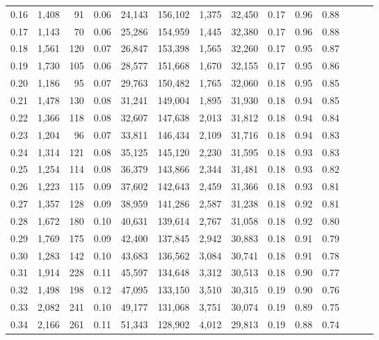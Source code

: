 \begin{tabular}{rrrrrrrrrrrrrr}
0.16 &  1,408 &     91 &  0.06 &   24,143 &  156,102 &   1,375 &  32,450 &  0.17 &  0.96 &      0.88 \\
0.17 &  1,143 &     70 &  0.06 &   25,286 &  154,959 &   1,445 &  32,380 &  0.17 &  0.96 &      0.88 \\
0.18 &  1,561 &    120 &  0.07 &   26,847 &  153,398 &   1,565 &  32,260 &  0.17 &  0.95 &      0.87 \\
0.19 &  1,730 &    105 &  0.06 &   28,577 &  151,668 &   1,670 &  32,155 &  0.17 &  0.95 &      0.86 \\
0.20 &  1,186 &     95 &  0.07 &   29,763 &  150,482 &   1,765 &  32,060 &  0.18 &  0.95 &      0.85 \\
0.21 &  1,478 &    130 &  0.08 &   31,241 &  149,004 &   1,895 &  31,930 &  0.18 &  0.94 &      0.85 \\
0.22 &  1,366 &    118 &  0.08 &   32,607 &  147,638 &   2,013 &  31,812 &  0.18 &  0.94 &      0.84 \\
0.23 &  1,204 &     96 &  0.07 &   33,811 &  146,434 &   2,109 &  31,716 &  0.18 &  0.94 &      0.83 \\
0.24 &  1,314 &    121 &  0.08 &   35,125 &  145,120 &   2,230 &  31,595 &  0.18 &  0.93 &      0.83 \\
0.25 &  1,254 &    114 &  0.08 &   36,379 &  143,866 &   2,344 &  31,481 &  0.18 &  0.93 &      0.82 \\
0.26 &  1,223 &    115 &  0.09 &   37,602 &  142,643 &   2,459 &  31,366 &  0.18 &  0.93 &      0.81 \\
0.27 &  1,357 &    128 &  0.09 &   38,959 &  141,286 &   2,587 &  31,238 &  0.18 &  0.92 &      0.81 \\
0.28 &  1,672 &    180 &  0.10 &   40,631 &  139,614 &   2,767 &  31,058 &  0.18 &  0.92 &      0.80 \\
0.29 &  1,769 &    175 &  0.09 &   42,400 &  137,845 &   2,942 &  30,883 &  0.18 &  0.91 &      0.79 \\
0.30 &  1,283 &    142 &  0.10 &   43,683 &  136,562 &   3,084 &  30,741 &  0.18 &  0.91 &      0.78 \\
0.31 &  1,914 &    228 &  0.11 &   45,597 &  134,648 &   3,312 &  30,513 &  0.18 &  0.90 &      0.77 \\
0.32 &  1,498 &    198 &  0.12 &   47,095 &  133,150 &   3,510 &  30,315 &  0.19 &  0.90 &      0.76 \\
0.33 &  2,082 &    241 &  0.10 &   49,177 &  131,068 &   3,751 &  30,074 &  0.19 &  0.89 &      0.75 \\
0.34 &  2,166 &    261 &  0.11 &   51,343 &  128,902 &   4,012 &  29,813 &  0.19 &  0.88 &      0.74 \\

\end{tabular}
